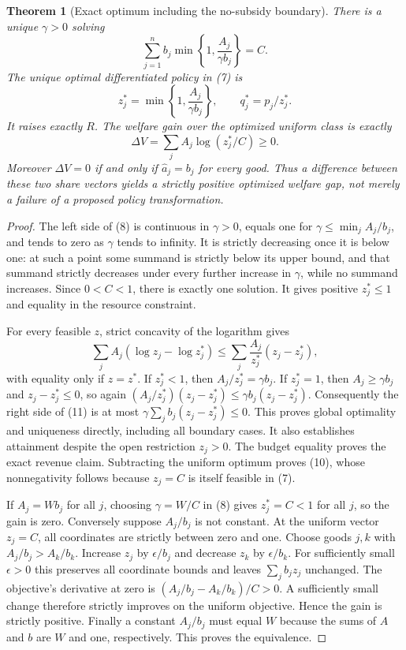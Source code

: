 \documentclass[11pt]{article}
\newtheorem{theorem}{Theorem}
\theoremstyle{definition}
\begin{document}
\begin{theorem}[Exact optimum including the no-subsidy boundary]
There is a unique $\gamma>0$ solving
\[
 \sum_{j=1}^n b_j\min\left\{1,\frac{A_j}{\gamma b_j}\right\}=C.
                                                               \tag{8}
\]
The unique optimal differentiated policy in (7) is
\[
 z_j^*=\min\left\{1,\frac{A_j}{\gamma b_j}\right\},
 \qquad q_j^*=p_j/z_j^*.                                    \tag{9}
\]
It raises exactly $R$. The welfare gain over the optimized uniform
class is exactly
\[
 \Delta V=\sum_j A_j\log(z_j^*/C)\geq0.                    \tag{10}
\]
Moreover $\Delta V=0$ if and only if
$\widehat a_j=b_j$ for every good. Thus a difference between these
two share vectors yields a strictly positive optimized welfare gap,
not merely a failure of a proposed policy transformation.
\end{theorem}
\begin{proof}
The left side of (8) is continuous in $\gamma>0$, equals one for
$\gamma\leq\min_j A_j/b_j$, and tends to zero as $\gamma$ tends to
infinity. It is strictly decreasing once it is below one: at such a
point some summand is strictly below its upper bound, and that summand
strictly decreases under every further increase in $\gamma$, while
no summand increases. Since $0<C<1$, there is exactly one solution.
It gives positive $z_j^*\leq1$ and equality in the resource constraint.

For every feasible $z$, strict concavity of the logarithm gives
\[
 \sum_j A_j(\log z_j-\log z_j^*)
 \leq\sum_j\frac{A_j}{z_j^*}(z_j-z_j^*),                   \tag{11}
\]
with equality only if $z=z^*$. If $z_j^*<1$, then
$A_j/z_j^*=\gamma b_j$. If $z_j^*=1$, then $A_j\geq\gamma b_j$
and $z_j-z_j^*\leq0$, so again
$(A_j/z_j^*)(z_j-z_j^*)\leq\gamma b_j(z_j-z_j^*)$.
Consequently the right side of (11) is at most
$\gamma\sum_jb_j(z_j-z_j^*)\leq0$. This proves global optimality
and uniqueness directly, including all boundary cases. It also
establishes attainment despite the open restriction $z_j>0$.
The budget equality proves the exact revenue claim. Subtracting the
uniform optimum proves (10), whose nonnegativity follows because
$z_j=C$ is itself feasible in (7).

If $A_j=Wb_j$ for all $j$, choosing $\gamma=W/C$ in (8) gives
$z_j^*=C<1$ for all $j$, so the gain is zero. Conversely suppose
$A_j/b_j$ is not constant. At the uniform vector $z_j=C$, all coordinates
are strictly between zero and one. Choose goods $j,k$ with
$A_j/b_j>A_k/b_k$. Increase $z_j$ by $\epsilon/b_j$ and decrease
$z_k$ by $\epsilon/b_k$. For sufficiently small $\epsilon>0$ this
preserves all coordinate bounds and leaves $\sum_jb_jz_j$ unchanged.
The objective's derivative at zero is
$(A_j/b_j-A_k/b_k)/C>0$. A sufficiently small change therefore strictly
improves on the uniform objective. Hence the gain is strictly positive.
Finally a constant $A_j/b_j$ must equal $W$ because the sums of $A$
and $b$ are $W$ and one, respectively. This proves the equivalence.
\end{proof}
\end{document}
